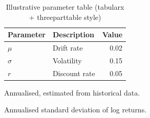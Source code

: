 \begin{table}[H]
\centering
\begin{threeparttable}
\caption{Illustrative parameter table (tabularx + threeparttable style)}
\label{tab:sample-parameters}
\begin{tabularx}{0.85\textwidth}{l>{\raggedright\arraybackslash}m{6.5cm}r}
\toprule
{\color{unipdblue}\bfseries Parameter} & {\color{unipdblue}\bfseries Description} & {\color{unipdblue}\bfseries Value} \\
\midrule
$\mu$ & Drift rate\tnote{a} & 0.02 \\
$\sigma$ & Volatility\tnote{b} & 0.15 \\
$r$ & Discount rate & 0.05 \\
\bottomrule
\end{tabularx}
\begin{tablenotes}
\small
\item[a] Annualised, estimated from historical data.
\item[b] Annualised standard deviation of log returns.
\end{tablenotes}
\end{threeparttable}
\end{table}
